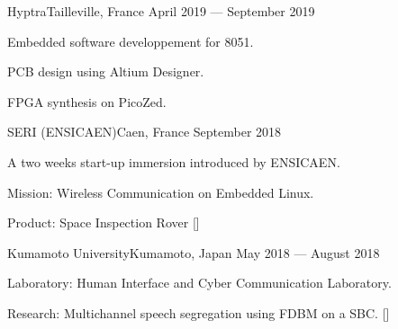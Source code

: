 
        {Hyptra}{Tailleville, France}
        {April 2019 --- September 2019}
        {
            \begin{additems}
                \item Embedded software developpement for 8051.
                \item PCB design using Altium Designer.
                \item FPGA synthesis on PicoZed.
            \end{additems}
        }

        {SERI (ENSICAEN)}{Caen, France}
        {September 2018}
        {
            \begin{additems}
                \item A two weeks start-up immersion introduced by ENSICAEN.
                \item Mission: Wireless Communication on Embedded Linux.
                \item Product: Space Inspection Rover []
            \end{additems}
        }

        {Kumamoto University}{Kumamoto, Japan}
        {May 2018 --- August 2018}
        {
            \begin{additems}
                \item Laboratory: Human Interface and Cyber Communication Laboratory.
                \item Research: Multichannel speech segregation using FDBM on a SBC. []
            \end{additems}
        }
